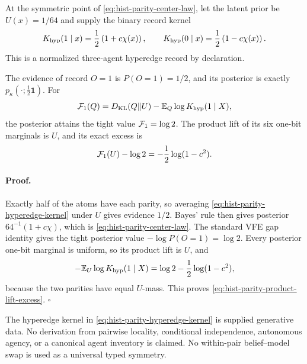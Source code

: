 At the symmetric point of \eqref{eq:hist-parity-center-law}, let the latent
prior be \(U(x)=1/64\) and supply the binary record kernel
\begin{equation}
K_{\rm hyp}(1\mid x)=\frac12\left(1+c\chi(x)\right),
\qquad
K_{\rm hyp}(0\mid x)=\frac12\left(1-c\chi(x)\right).
\label{eq:hist-parity-hyperedge-kernel}
\end{equation}
This is a normalized three-agent hyperedge record by declaration.

The evidence of record \(O=1\) is \(P(O=1)=1/2\), and its posterior is
exactly \(p_\kappa(\mathord{\cdot};\tfrac12\mathbf1)\).  For
\begin{equation}
\mathcal F_1(Q)
=D_{\mathrm{KL}}(Q\Vert U)-\mathbb E_Q\log K_{\rm hyp}(1\mid X),
\label{eq:hist-parity-hyperedge-vfe}
\end{equation}
the posterior attains the tight value \(\mathcal F_1=\log2\).  The product
lift of its six one-bit marginals is \(U\), and its exact excess is
\begin{equation}
\mathcal F_1(U)-\log2=-\frac12\log(1-c^2).
\label{eq:hist-parity-product-lift-excess}
\end{equation}

\paragraph{Proof.}
Exactly half of the atoms have each parity, so averaging
\eqref{eq:hist-parity-hyperedge-kernel} under \(U\) gives evidence \(1/2\).
Bayes' rule then gives posterior
\(64^{-1}(1+c\chi)\), which is
\eqref{eq:hist-parity-center-law}.  The standard VFE gap identity gives the
tight posterior value \(-\log P(O=1)=\log2\).  Every posterior one-bit
marginal is uniform, so its product lift is \(U\), and
\begin{equation}
-\mathbb E_U\log K_{\rm hyp}(1\mid X)
=\log2-\frac12\log(1-c^2),
\label{eq:hist-parity-uniform-vfe}
\end{equation}
because the two parities have equal \(U\)-mass.  This proves
\eqref{eq:hist-parity-product-lift-excess}.  \(\square\)

The hyperedge kernel in \eqref{eq:hist-parity-hyperedge-kernel} is supplied
generative data.  No derivation from pairwise locality, conditional
independence, autonomous agency, or a canonical agent inventory is claimed.
No within-pair belief--model swap is used as a universal typed symmetry.

